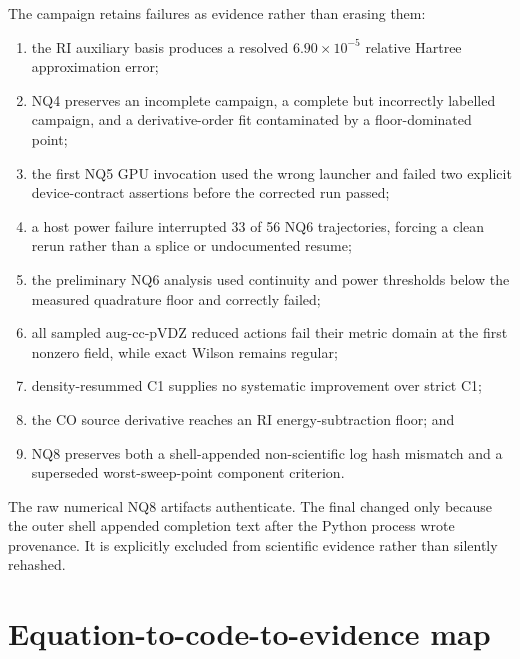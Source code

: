 \documentclass[11pt]{article}
\begin{document}
The campaign retains failures as evidence rather than erasing them:

\begin{enumerate}
  \item the RI auxiliary basis produces a resolved $6.90\times10^{-5}$
        relative Hartree approximation error;
  \item NQ4 preserves an incomplete campaign, a complete but incorrectly
        labelled campaign, and a derivative-order fit contaminated by a
        floor-dominated point;
  \item the first NQ5 GPU invocation used the wrong launcher and failed two
        explicit device-contract assertions before the corrected run passed;
  \item a host power failure interrupted 33 of 56 NQ6 trajectories, forcing a
        clean rerun rather than a splice or undocumented resume;
  \item the preliminary NQ6 analysis used continuity and power thresholds
        below the measured quadrature floor and correctly failed;
  \item all sampled aug-cc-pVDZ reduced actions fail their metric domain at
        the first nonzero field, while exact Wilson remains regular;
  \item density-resummed C1 supplies no systematic improvement over strict C1;
  \item the CO source derivative reaches an RI energy-subtraction floor; and
  \item NQ8 preserves both a shell-appended non-scientific log hash mismatch
        and a superseded worst-sweep-point component criterion.
\end{enumerate}

The raw numerical NQ8 artifacts authenticate.  The final 
changed only because the outer shell appended completion text after the
Python process wrote provenance.  It is explicitly excluded from scientific
evidence rather than silently rehashed.

\section{Equation-to-code-to-evidence map}
\end{document}
